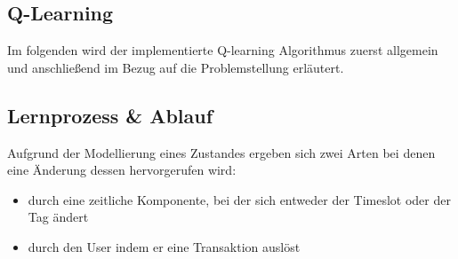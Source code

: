 \subsection{Q-Learning}
\label{subsec:y-ql}
Im folgenden wird der implementierte Q-learning Algorithmus zuerst allgemein und anschließend im Bezug auf die Problemstellung erläutert.\\
 
\subsection{Lernprozess \& Ablauf}
\label{subsec:learning}

Aufgrund der Modellierung eines Zustandes ergeben sich zwei Arten bei denen eine Änderung dessen hervorgerufen wird: 
\begin{itemize}
	\item durch eine zeitliche Komponente, bei der sich entweder der Timeslot oder der Tag ändert
	\item durch den User indem er eine Transaktion auslöst
\end{itemize}

